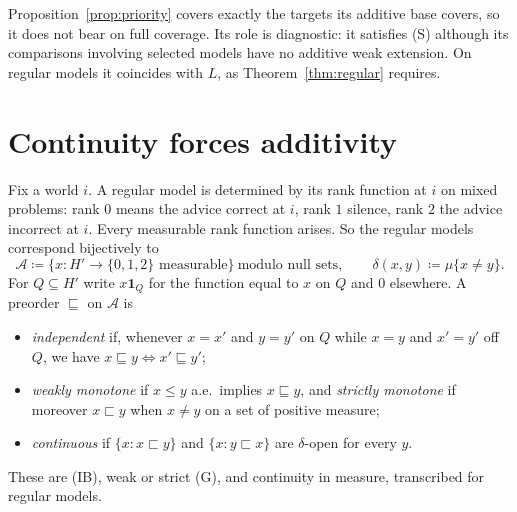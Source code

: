 \documentclass[11pt]{article}
\theoremstyle{remark}\newtheorem{remark}[theorem]{Remark}
\newcommand{\Ascr}{\mathcal A}
\newcommand{\one}{\mathbf 1}
\begin{document}
Proposition~\ref{prop:priority} covers exactly the targets its additive base
covers, so it does not bear on full coverage. Its role is diagnostic: it
satisfies (S) although its comparisons involving selected models have no
additive weak extension. On regular models it coincides with $L$, as
Theorem~\ref{thm:regular} requires.

\section{Continuity forces additivity}

Fix a world $i$. A regular model is determined by its rank function at $i$
on mixed problems: rank $0$ means the advice correct at $i$, rank $1$ silence,
rank $2$ the advice incorrect at $i$. Every measurable rank function arises.
So the regular models correspond bijectively to
\[
 \Ascr\coloneqq\{x:H'\to\{0,1,2\}\text{ measurable}\}\ \text{modulo null sets},
 \qquad \delta(x,y)\coloneqq\mu\{x\ne y\}.
\]
For $Q\subseteq H'$ write $x\one_Q$ for the function equal to $x$ on $Q$ and
$0$ elsewhere. A preorder $\sqsubseteq$ on $\Ascr$ is
\begin{itemize}[leftmargin=*,itemsep=2pt]
\item \emph{independent} if, whenever $x=x'$ and $y=y'$ on $Q$ while $x=y$ and
$x'=y'$ off $Q$, we have $x\sqsubseteq y\iff x'\sqsubseteq y'$;
\item \emph{weakly monotone} if $x\le y$ a.e.\ implies $x\sqsubseteq y$, and
\emph{strictly monotone} if moreover $x\sqsubset y$ when $x\ne y$ on a set of
positive measure;
\item \emph{continuous} if $\{x:x\sqsubset y\}$ and $\{x:y\sqsubset x\}$ are
$\delta$-open for every $y$.
\end{itemize}
These are (IB), weak or strict (G), and continuity in measure, transcribed
for regular models.
\end{document}
